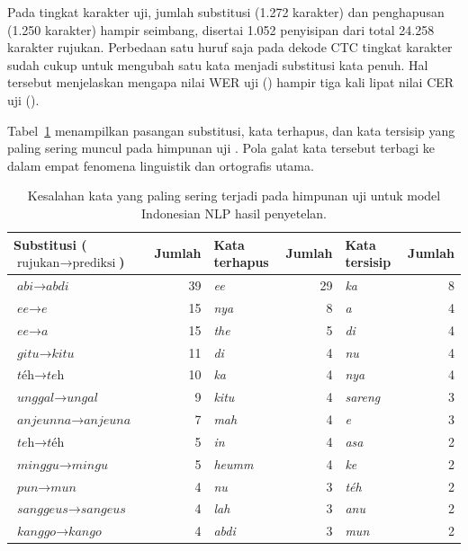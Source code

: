 Pada tingkat karakter uji, jumlah substitusi (1.272 karakter) dan penghapusan (1.250 karakter) hampir seimbang, disertai 1.052 penyisipan dari total 24.258 karakter rujukan. Perbedaan satu huruf saja pada dekode CTC tingkat karakter sudah cukup untuk mengubah satu kata menjadi substitusi kata penuh. Hal tersebut menjelaskan mengapa nilai WER uji () hampir tiga kali lipat nilai CER uji ().

Tabel~\ref{tab:kesalahan-kata} menampilkan pasangan substitusi, kata terhapus, dan kata tersisip yang paling sering muncul pada himpunan uji \cite{repoasr}. Pola galat kata tersebut terbagi ke dalam empat fenomena linguistik dan ortografis utama.

\begin{table}[!htbp]
  \centering\small
  \caption{Kesalahan kata yang paling sering terjadi pada himpunan uji untuk model Indonesian NLP hasil penyetelan.}
  \label{tab:kesalahan-kata}
  \begin{tabular}{@{}lrlrlr@{}}
    \toprule
    Substitusi (\(\text{rujukan} \rightarrow \text{prediksi}\)) & Jumlah & Kata terhapus & Jumlah & Kata tersisip & Jumlah \\
    \midrule
    \(\textit{abi} \rightarrow \textit{abdi}\) & 39 & \textit{ee} & 29 & \textit{ka} & 8 \\
    \(\textit{ee} \rightarrow \textit{e}\) & 15 & \textit{nya} & 8 & \textit{a} & 4 \\
    \(\textit{ee} \rightarrow \textit{a}\) & 15 & \textit{the} & 5 & \textit{di} & 4 \\
    \(\textit{gitu} \rightarrow \textit{kitu}\) & 11 & \textit{di} & 4 & \textit{nu} & 4 \\
    \(\textit{téh} \rightarrow \textit{teh}\) & 10 & \textit{ka} & 4 & \textit{nya} & 4 \\
    \(\textit{unggal} \rightarrow \textit{ungal}\) & 9 & \textit{kitu} & 4 & \textit{sareng} & 3 \\
    \(\textit{anjeunna} \rightarrow \textit{anjeuna}\) & 7 & \textit{mah} & 4 & \textit{e} & 3 \\
    \(\textit{teh} \rightarrow \textit{téh}\) & 5 & \textit{in} & 4 & \textit{asa} & 2 \\
    \(\textit{minggu} \rightarrow \textit{mingu}\) & 5 & \textit{heumm} & 4 & \textit{ke} & 2 \\
    \(\textit{pun} \rightarrow \textit{mun}\) & 4 & \textit{nu} & 3 & \textit{téh} & 2 \\
    \(\textit{sanggeus} \rightarrow \textit{sangeus}\) & 4 & \textit{lah} & 3 & \textit{anu} & 2 \\
    \(\textit{kanggo} \rightarrow \textit{kango}\) & 4 & \textit{abdi} & 3 & \textit{mun} & 2 \\
    \bottomrule
  \end{tabular}
\end{table}


